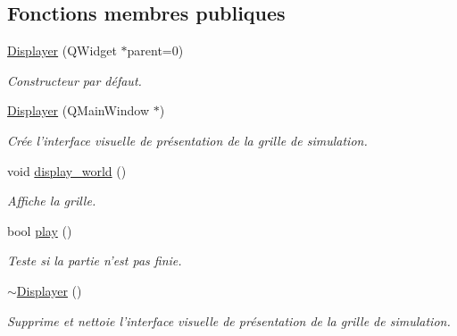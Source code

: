 \subsection*{Fonctions membres publiques}
\begin{DoxyCompactItemize}
\item 
\hyperlink{classDisplayer_a04104e09562ed9f64a96174ab5409dc2}{Displayer} (Q\-Widget $\ast$parent=0)
\begin{DoxyCompactList}\small\item\em Constructeur par défaut. \end{DoxyCompactList}\item 
\hyperlink{classDisplayer_a099a08baae9c7985acf6cca4fa2d0509}{Displayer} (Q\-Main\-Window $\ast$)
\begin{DoxyCompactList}\small\item\em Crée l'interface visuelle de présentation de la grille de simulation. \end{DoxyCompactList}\item 
\hypertarget{classDisplayer_a43b024cbfed7610ee3b91a7ba52a1a5b}{void \hyperlink{classDisplayer_a43b024cbfed7610ee3b91a7ba52a1a5b}{display\-\_\-world} ()}\label{classDisplayer_a43b024cbfed7610ee3b91a7ba52a1a5b}

\begin{DoxyCompactList}\small\item\em Affiche la grille. \end{DoxyCompactList}\item 
bool \hyperlink{classDisplayer_a60656ce57ab16d1265fea3dfa5bf22cf}{play} ()
\begin{DoxyCompactList}\small\item\em Teste si la partie n'est pas finie. \end{DoxyCompactList}\item 
\hypertarget{classDisplayer_a9f5cdcdfae1594e835973926df0da537}{\hyperlink{classDisplayer_a9f5cdcdfae1594e835973926df0da537}{$\sim$\-Displayer} ()}\label{classDisplayer_a9f5cdcdfae1594e835973926df0da537}

\begin{DoxyCompactList}\small\item\em Supprime et nettoie l'interface visuelle de présentation de la grille de simulation. \end{DoxyCompactList}\end{DoxyCompactItemize}
